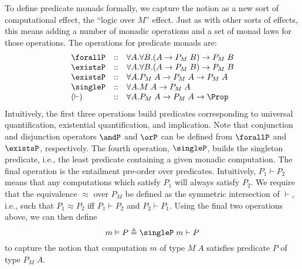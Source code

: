 \documentclass[preprint]{sigplanconf}
\begin{document}
To define predicate monads formally, we capture the notion as a new sort of
computational effect, the ``logic over $M$'' effect. Just as with other sorts of
effects, this means adding a number of monadic operations and a set of monad
laws for those operations. The operations for predicate monads are:
\[
\begin{array}{lcl}
  \forallP & :: & \forall A.\forall B.(A\to P_M\;B) \to P_M\;B\\
  \existsP & :: & \forall A.\forall B.(A\to P_M\;B) \to P_M\;B\\
  \existsP & :: & \forall A.P_M\;A \to P_M\;A \to P_M\;A\\
  \singleP & :: & \forall A.M\;A \to P_M\;A\\
  (\vdash) & :: & \forall A. P_ M\;A \to P_ M\;A \to \Prop
\end{array}
\]
Intuitively, the first three operations build predicates corresponding to
universal quantification, existential quantification, and implication. Note that
conjunction and disjunction operators $\andP$ and $\orP$ can be defined from
$\forallP$ and $\existsP$, respectively.  The fourth operation, $\singleP$,
builds the singleton predicate, i.e., the least predicate containing a given
monadic computation. The final operation is the entailment pre-order over
predicates. Intuitively, $P_1\vdash P_2$ means that any computations which
satisfy $P_1$ will always satisfy $P_2$. We require that the equivalence
$\approx$ over $P_M$ be defined as the symmetric intersection of $\vdash$, i.e.,
such that $P_1\approx P_2$ iff $P_1\vdash P_2$ and $P_2\vdash P_1$. Using the
final two operations above, we can then define
\[
m \vDash P \triangleq \singleP\;m \vdash P
\]
to capture the notion that computation $m$ of type $M\;A$ satisfies predicate
$P$ of type $P_M\;A$.
\end{document}
